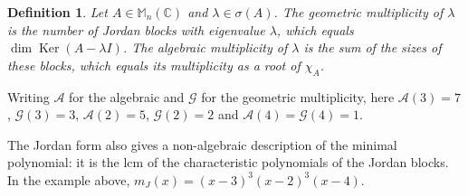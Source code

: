 \documentclass[12pt]{article}
\DeclareMathOperator{\Ker}{Ker}
\theoremstyle{breakplain}
\theoremstyle{breakdef}
\newtheorem{definition}[theorem]{Definition}
\theoremstyle{remark}
\begin{document}
\begin{definition}
    Let $A\in \mathbb{M}_n(\mathbb{C})$ and $\lambda\in\sigma(A)$. The \emph{geometric multiplicity} of $\lambda$ is the number of Jordan blocks with eigenvalue $\lambda$, which equals $\dim\Ker(A-\lambda I)$. The \emph{algebraic multiplicity} of $\lambda$ is the sum of the sizes of these blocks, which equals its multiplicity as a root of $\chi_A$.
\end{definition}
\par\medskip\noindent
\begin{minipage}{0.58\textwidth}
\end{minipage}
\hfill
\begin{minipage}{0.38\textwidth}
Writing $\mathscr{A}$ for the algebraic and $\mathscr{G}$ for the geometric multiplicity, here $\mathscr{A}(3)=7$, $\mathscr{G}(3)=3$, $\mathscr{A}(2)=5$, $\mathscr{G}(2)=2$ and $\mathscr{A}(4)=\mathscr{G}(4)=1$.
\end{minipage}
\par\medskip
The Jordan form also gives a non-algebraic description of the minimal polynomial: it is the $\mathrm{lcm}$ of the characteristic polynomials of the Jordan blocks. In the example above, $m_J(x)=(x-3)^3(x-2)^3(x-4)$.

\newpage
\end{document}
